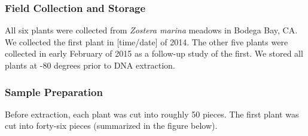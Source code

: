 
\subsubsection{Field Collection and Storage}

All six plants were collected from \textit{Zostera marina} meadows in Bodega Bay, CA. We collected the first plant in [time/date] of 2014. The other five plants were collected in early February of 2015 as a follow-up study of the first. We stored all plants at -80 degrees prior to DNA extraction. 

\subsubsection{Sample Preparation}

Before extraction, each plant was cut into roughly 50 pieces. The first plant was cut into forty-six pieces (summarized in the figure below).